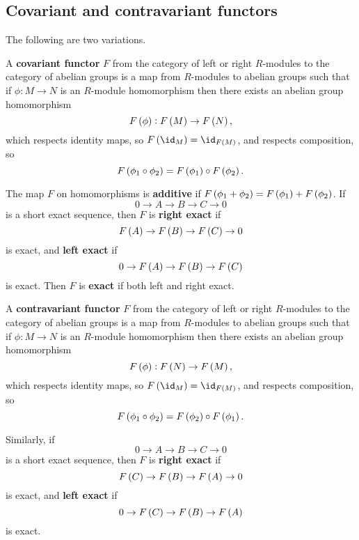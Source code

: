 \subsection{Covariant and contravariant functors}


The following are two variations.

\begin{definition}
A \textbf{covariant functor} $ F $ from the category of left or right $ R $-modules to the category of abelian groups is a map from $ R $-modules to abelian groups such that if $ \phi : M \to N $ is an $ R $-module homomorphism then there exists an abelian group homomorphism
$$ F\br{\phi} : F\br{M} \to F\br{N}, $$
which respects identity maps, so $ F\br{\id_M} = \id_{F\br{M}} $, and respects composition, so
$$ F\br{\phi_1 \circ \phi_2} = F\br{\phi_1} \circ F\br{\phi_2}. $$
\end{definition}

The map $ F $ on homomorphisms is \textbf{additive} if $ F\br{\phi_1 + \phi_2} = F\br{\phi_1} + F\br{\phi_2} $. If
$$ 0 \to A \to B \to C \to 0 $$
is a short exact sequence, then $ F $ is \textbf{right exact} if
$$ F\br{A} \to F\br{B} \to F\br{C} \to 0 $$
is exact, and \textbf{left exact} if
$$ 0 \to F\br{A} \to F\br{B} \to F\br{C} $$
is exact. Then $ F $ is \textbf{exact} if both left and right exact.

\begin{definition}
A \textbf{contravariant functor} $ F $ from the category of left or right $ R $-modules to the category of abelian groups is a map from $ R $-modules to abelian groups such that if $ \phi : M \to N $ is an $ R $-module homomorphism then there exists an abelian group homomorphism
$$ F\br{\phi} : F\br{N} \to F\br{M}, $$
which respects identity maps, so $ F\br{\id_M} = \id_{F\br{M}} $, and respects composition, so
$$ F\br{\phi_1 \circ \phi_2} = F\br{\phi_2} \circ F\br{\phi_1}. $$
\end{definition}

Similarly, if
$$ 0 \to A \to B \to C \to 0 $$
is a short exact sequence, then $ F $ is \textbf{right exact} if
$$ F\br{C} \to F\br{B} \to F\br{A} \to 0 $$
is exact, and \textbf{left exact} if
$$ 0 \to F\br{C} \to F\br{B} \to F\br{A} $$
is exact.

